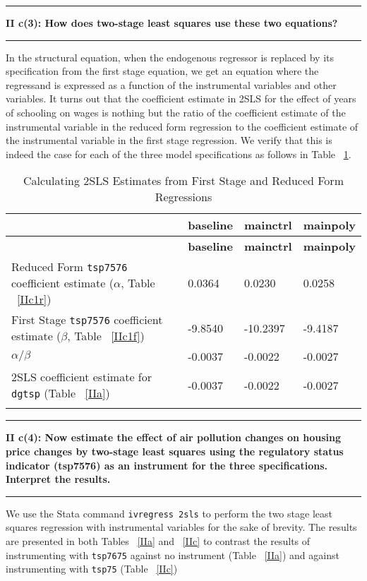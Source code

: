 \documentclass[12pt]{article}
\newcommand\question[2]{\vspace{1em}\hrule\vspace{1em}\textbf{#1: #2}\vspace{1em}\hrule\vspace{1em}}
\begin{document}
\question{II c(3)}{How does two-stage least squares use these two equations? }
In the structural equation, when the endogenous regressor is replaced by its specification from the first stage equation, we get an equation where the regressand is expressed as a function of the instrumental variables and other variables. It turns out that the coefficient estimate in 2SLS for the effect of years of schooling on wages is nothing but the ratio of the coefficient estimate of the instrumental variable in the reduced form regression to the coefficient estimate of the instrumental variable in the first stage regression. We verify that this is indeed the case for each of the three model specifications as follows in Table ~\ref{calc2sls}.
\par
\begin{center}
\begin{longtable}{|p{}|p{}|p{}|p{}|}
\hline&\textbf{baseline}&\textbf{mainctrl}&\textbf{mainpoly}\\\hline
\endfirsthead
\hline&\textbf{baseline}&\textbf{mainctrl}&\textbf{mainpoly}\\\hline
\endhead

Reduced Form \verb|tsp7576| coefficient estimate ($\alpha$, Table ~\ref{IIc1r})&0.0364&0.0230&0.0258\\\hline
First Stage \verb|tsp7576| coefficient estimate ($\beta$, Table ~\ref{IIc1f})&-9.8540&-10.2397&-9.4187\\\hline
$\alpha/\beta$&-0.0037&-0.0022&-0.0027\\\hline
2SLS coefficient estimate for \verb|dgtsp| (Table ~\ref{IIa})&-0.0037&-0.0022&-0.0027\\\hline

\caption {Calculating 2SLS Estimates from First Stage and Reduced Form Regressions}
\label{calc2sls}\\
\end{longtable}
\end{center}

\question{II c(4)}{Now estimate the effect of air pollution changes on housing price changes by two-stage least squares using the regulatory status indicator (tsp7576) as an instrument for the three specifications.  Interpret the results.}

We use the Stata command \verb|ivregress 2sls| to perform the two stage least squares regression with instrumental variables for the sake of brevity. The results are presented in both Tables ~\ref{IIa} and ~\ref{IIc} to contrast the results of instrumenting with \verb|tsp7675| against no instrument (Table ~\ref{IIa}) and against instrumenting with \verb|tsp75| (Table ~\ref{IIc})
\end{document}
